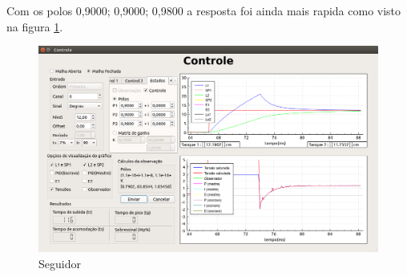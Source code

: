 \documentclass[a4paper,12pt]{article}
\begin{document}
\hspace{4ex}Com os polos 0,9000; 0,9000; 0,9800 a resposta foi ainda mais rapida como visto na figura \ref{img4}.
\begin{figure}[!h]
\centering
\includegraphics[width=13cm]{FotosSeguidor/MuitoBom}
\caption{Seguidor}
\label{img4}
\end{figure}
\end{document}
